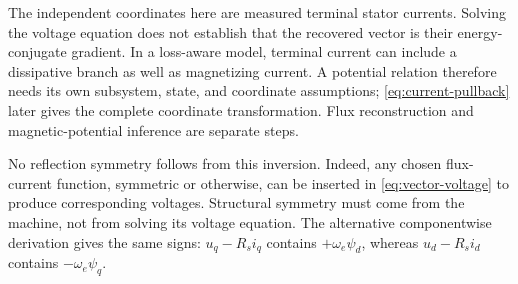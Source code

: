 The independent coordinates here are measured terminal stator currents.
Solving the voltage equation does not establish that the recovered vector
is their energy-conjugate gradient. In a loss-aware model, terminal current
can include a dissipative branch as well as magnetizing current. A potential
relation therefore needs its own subsystem, state, and coordinate assumptions;
\cref{eq:current-pullback} later gives the complete coordinate transformation.
Flux reconstruction and magnetic-potential inference are separate steps.

No reflection symmetry follows from this inversion. Indeed, any chosen
flux-current function, symmetric or otherwise, can be inserted in
\cref{eq:vector-voltage} to produce corresponding voltages. Structural
symmetry must come from the machine, not from solving its voltage equation.
The alternative componentwise derivation gives the same signs: $u_q-R_si_q$
contains $+\omega_e\psi_d$, whereas $u_d-R_si_d$ contains
$-\omega_e\psi_q$.
